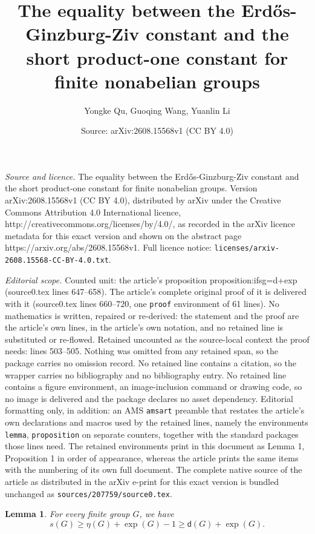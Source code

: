 \documentclass[10pt,a4paper]{amsart}
\title{The equality between the Erd\H{o}s-Ginzburg-Ziv constant and the short product-one constant for finite nonabelian groups}
\author{Yongke Qu, Guoqing Wang, Yuanlin Li}
\date{Source: arXiv:2608.15568v1 (CC BY 4.0)}
\newtheorem{lemma}{Lemma}
\begin{document}
\maketitle

\noindent\emph{Source and licence.} The equality between the Erd\H{o}s-Ginzburg-Ziv constant and the short product-one constant for finite nonabelian groups. Version arXiv:2608.15568v1 (CC BY 4.0), distributed by arXiv under the Creative Commons Attribution 4.0 International licence, http://creativecommons.org/licenses/by/4.0/, as recorded in the arXiv licence metadata for this exact version and shown on the abstract page https://arxiv.org/abs/2608.15568v1. Full licence notice: \texttt{licenses/arxiv-2608.15568-CC-BY-4.0.txt}.\par\smallskip

\noindent\textit{Editorial scope.} Counted unit: the article's proposition proposition:ifsg=d+exp (source0.tex lines 647--658). The article's complete original proof of it is delivered with it (source0.tex lines 660--720, one \texttt{proof} environment of 61 lines). No mathematics is written, repaired or re-derived: the statement and the proof are the article's own lines, in the article's own notation, and no retained line is substituted or re-flowed.  Retained uncounted as the source-local context the proof needs: lines 503--505.  Nothing was omitted from any retained span, so the package carries no omission record.  No retained line contains a citation, so the wrapper carries no bibliography and no bibliography entry.  No retained line contains a figure environment, an image-inclusion command or drawing code, so no image is delivered and the package declares no asset dependency.  Editorial formatting only, in addition: an AMS \texttt{amsart} preamble that restates the article's own declarations and macros used by the retained lines, namely the environments \texttt{lemma}, \texttt{proposition} on separate counters, together with the standard packages those lines need.  The retained environments print in this document as Lemma 1, Proposition 1 in order of appearance, whereas the article prints the same items with the numbering of its own full document.  The complete native source of the article as distributed in the arXiv e-print for this exact version is bundled unchanged as \texttt{sources/207759/source0.tex}.
\begin{lemma}\label{lemma:universallower}
For every finite group $G$, we have $$s(G)\geq\eta(G)+\exp(G)-1\geq \mathsf d(G)+\exp(G).$$
\end{lemma}
\end{document}
